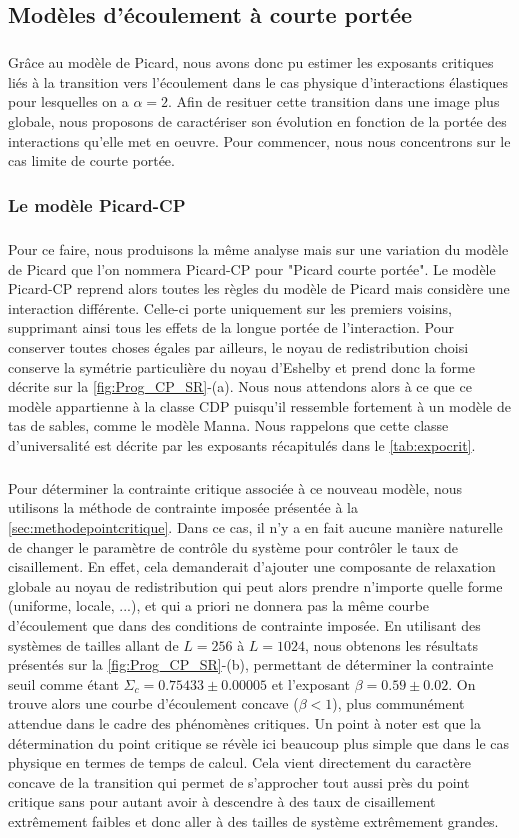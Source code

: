 \subsection{Modèles d'écoulement à courte portée}

\subparagraph{}Grâce au modèle de Picard, nous avons donc pu estimer les exposants critiques liés à la transition vers l'écoulement dans le cas physique d'interactions élastiques pour lesquelles on a $\alpha = 2$. Afin de resituer cette transition dans une image plus globale, nous proposons de caractériser son évolution en fonction de la portée des interactions qu'elle met en oeuvre. Pour commencer, nous nous concentrons sur le cas limite de courte portée.

\subsubsection{Le modèle Picard-CP}

\subparagraph{} Pour ce faire, nous produisons la même analyse mais sur une variation du modèle de Picard que l'on nommera Picard-CP pour "Picard courte portée". Le modèle Picard-CP reprend alors toutes les règles du modèle de Picard mais considère une interaction différente. Celle-ci porte uniquement sur les premiers voisins, supprimant ainsi tous les effets de la longue portée de l'interaction. Pour conserver toutes choses égales par ailleurs, le noyau de redistribution choisi conserve la symétrie particulière du noyau d'Eshelby et prend donc la forme décrite sur la \autoref{fig:Prog_CP_SR}-(a). Nous nous attendons alors à ce que ce modèle appartienne à la classe CDP puisqu'il ressemble fortement à un modèle de tas de sables, comme le modèle Manna. Nous rappelons que cette classe d'universalité est décrite par les exposants récapitulés dans le \autoref{tab:expocrit}.

\subparagraph{}Pour déterminer la contrainte critique associée à ce nouveau modèle, nous utilisons la méthode de contrainte imposée présentée à la \autoref{sec:methodepointcritique}. Dans ce cas, il n'y a en fait aucune manière naturelle de changer le paramètre de contrôle du système pour contrôler le taux de cisaillement. En effet, cela demanderait d'ajouter une composante de relaxation globale au noyau de redistribution qui peut alors prendre n'importe quelle forme (uniforme, locale, ...), et qui a priori ne donnera pas la même courbe d'écoulement que dans des conditions de contrainte imposée. En utilisant des systèmes de tailles allant de $L=256$ à $L=1024$, nous obtenons les résultats présentés sur la \autoref{fig:Prog_CP_SR}-(b), permettant de déterminer la contrainte seuil comme étant $\Sigma_c = 0.75433 \pm 0.00005$ et l'exposant $\beta = 0.59 \pm 0.02$. On trouve alors une courbe d'écoulement concave ($\beta < 1$), plus communément attendue dans le cadre des phénomènes critiques. Un point à noter est que la détermination du point critique se révèle ici beaucoup plus simple que dans le cas physique en termes de temps de calcul. Cela vient directement du caractère concave de la transition qui permet de s'approcher tout aussi près du point critique sans pour autant avoir à descendre à des taux de cisaillement extrêmement faibles et donc aller à des tailles de système extrêmement grandes.

